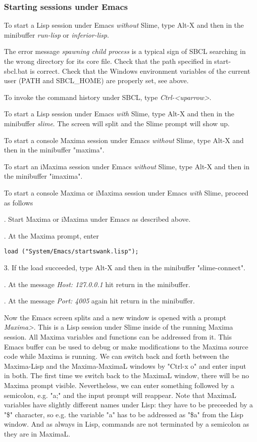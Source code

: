 \documentclass[../Maxima_Workbook.tex]{subfiles}
\begin{document}
\subsubsection{Starting sessions under Emacs}

To start a Lisp session under Emacs \emph{without} Slime, type Alt-X and then in the minibuffer \emph{run-lisp} or \emph{inferior-lisp}.

\lz The error message \emph{spawning child process} is a typical sign of SBCL searching in the wrong directory for its core file. Check that the path specified in start-sbcl.bat is correct. Check that the Windows environment variables of the current user (PATH and SBCL\_HOME) are properly set, see above.

\lz To invoke the command history under SBCL, type \emph{Ctrl-<uparrow>}.

\lz To start a Lisp session under Emacs \emph{with} Slime, type Alt-X and then in the minibuffer \emph{slime}. The screen will split and the Slime prompt will show up.

\lz To start a console Maxima session under Emacs \emph{without} Slime, type Alt-X and then in the minibuffer "maxima".

\lz To start an iMaxima session under Emacs \emph{without} Slime, type Alt-X and then in the minibuffer "imaxima".

\lz To start a console Maxima or iMaxima session under Emacs \emph{with} Slime, proceed as follows

. Start Maxima or iMaxima under Emacs as described above. 

. At the Maxima prompt, enter

\begin{lstlisting}[style=lisp]
load ("System/Emacs/startswank.lisp");
\end{lstlisting}

3. If the load succeeded, type Alt-X and then in the minibuffer "slime-connect".

. At the message \emph{Host: 127.0.0.1} hit return in the minibuffer.

. At the message \emph{Port: 4005} again hit return in the minibuffer.

\lz Now the Emacs screen splits and a new window is opened with a prompt \emph{Maxima>}. This is a Lisp session under Slime inside of the running Maxima session. All Maxima variables and functions can be addressed from it. This Emacs buffer can be used to debug or make modifications to the Maxima source code while Maxima is running. We can switch back and forth between the Maxima-Lisp and the Maxima-MaximaL windows by "Ctrl-x o" and enter input in both. The first time we switch back to the MaximaL window, there will be no Maxima prompt visible. Nevertheless, we can enter something followed by a semicolon, e.g. "a;" and the input prompt will reappear. Note that MaximaL variables have slightly different names under Lisp: they have to be preceeded by a "\$" character, so e.g. the variable "a" has to be addressed as "\$a" from the Lisp window. And as always in Lisp, commands are not terminated by a semicolon as they are in MaximaL.
\end{document}

